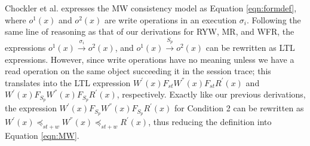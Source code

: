 \documentclass[journal,compsoc]{IEEEtran}
\begin{document}
  \par Chockler et al. expresses the MW consistency model as Equation \ref{eqn:formdef}, where %
 $\mathit{o}^1(x)$ and $\mathit{o}^2(x)$ are   write operations in an execution $\sigma_i$. %
  Following the same line of reasoning as that of our derivations for RYW, MR, and WFR, the expressions $\mathit{o}^1(x) \xrightarrow{\sigma_i} \mathit{o}^2(x)$,
  and $\mathit{o}^1(x) \xrightarrow{S_p} \mathit{o}^2(x)$  can be rewritten as LTL expressions. However, since write operations have no meaning unless we have a read operation on the same object succeeding it in the session trace; this translates into the LTL expression  
   $W^{'}(x) F_\mathit{st}  W^{''}(x) F_\mathit{st}  R^{'}(x)$ and $W^{'}(x) F_{S_p} W^{''}(x) F_{S_p} R^{'}(x)$, respectively. 
 Exactly like our previous derivations, the expression $W^{'}(x)  F_{S_p} W^{''}(x) F_{S_p} R^{'}(x)$ for Condition 2  can be rewritten as  $W^{'}(x)  \preccurlyeq_{\mathit{st}+w} W^{''}(x) \preccurlyeq_{\mathit{st}+w} R^{'}(x)$,  thus reducing the definition into Equation \ref{eqn:MW}. 
\end{document}

